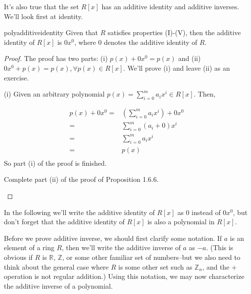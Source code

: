 It's also true that the set $R[x]$ has an additive identity and additive inverses. We'll look first at identity.

\begin{prop}{polyadditiveidentity}  Given that $R$ satisfies properties (I)-(V), then the additive identity of $R[x]$ is $0x^0$, where $0$ denotes the additive identity of $R$. 
\end{prop}

\begin{proof}
The proof has two parts:  (i) $p(x)+0x^0=p(x)$ and (ii) $0x^0+p(x)=p(x),  \forall p(x)   \in R[x]$. We'll prove (i) and leave (ii) as an exercise.

\noindent
(i) Given an arbitrary polynomial $p(x)= \sum^{m}_{i=0} a_i x^i \in R[x]$. Then,

\begin{align*}
p(x)+0x^0=&\left(\sum^{m}_{i=0} a_i x^i\right)+0x^0\\
=&\sum^{m}_{i=0} (a_i+0) x^i\\
=&\sum^{m}_{i=0} a_i x^i\\
=&p(x)\\
\end{align*}
So part (i) of the proof is finished.

\begin{exercise}{}
Complete part (ii) of the proof of Proposition 1.6.6.
\end{exercise}
\end{proof}

%
%

\noindent
In the following we'll write the additive identity of $R[x]$ as $0$ instead of $0x^0$, but don't forget that the additive identity of $R[x]$ is also a polynomial in $R[x]$.

Before we prove additive inverse, we should first clarify some notation. If $a$ is an element of a ring $R$, then we'll write the additive inverse of $a$ as $-a$.  (This is obvious if $R$ is $\mathbb{R}$, $\mathbb{Z}$, or some other familiar set of numbers--but 
we also need to think about the general case where $R$ is some other set such as $\mathbb{Z}_n$, and the $+$ operation is not regular addition.)  Using this notation, we may now characterize the additive inverse of a polynomial.

